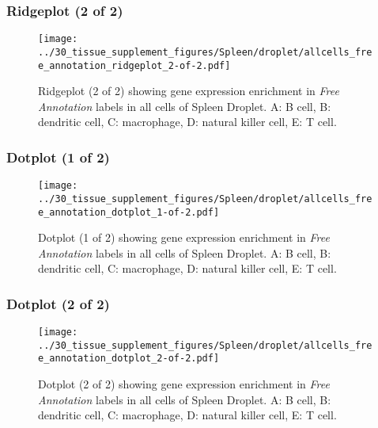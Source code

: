 \clearpage

\subsubsection{Ridgeplot (2 of 2)}
\begin{figure}[h]
\centering
\texttt{[image: ../30\_tissue\_supplement\_figures/Spleen/droplet/allcells\_free\_annotation\_ridgeplot\_2-of-2.pdf]}

\caption{ Ridgeplot (2 of 2)  showing gene expression enrichment in \emph{Free Annotation} labels in all cells of Spleen Droplet. A: B cell, B: dendritic cell, C: macrophage, D: natural killer cell, E: T cell.}
\end{figure}


\clearpage

\subsubsection{Dotplot (1 of 2)}
\begin{figure}[h]
\centering
\texttt{[image: ../30\_tissue\_supplement\_figures/Spleen/droplet/allcells\_free\_annotation\_dotplot\_1-of-2.pdf]}

\caption{ Dotplot (1 of 2)  showing gene expression enrichment in \emph{Free Annotation} labels in all cells of Spleen Droplet. A: B cell, B: dendritic cell, C: macrophage, D: natural killer cell, E: T cell.}
\end{figure}


\clearpage

\subsubsection{Dotplot (2 of 2)}
\begin{figure}[h]
\centering
\texttt{[image: ../30\_tissue\_supplement\_figures/Spleen/droplet/allcells\_free\_annotation\_dotplot\_2-of-2.pdf]}

\caption{ Dotplot (2 of 2)  showing gene expression enrichment in \emph{Free Annotation} labels in all cells of Spleen Droplet. A: B cell, B: dendritic cell, C: macrophage, D: natural killer cell, E: T cell.}
\end{figure}

